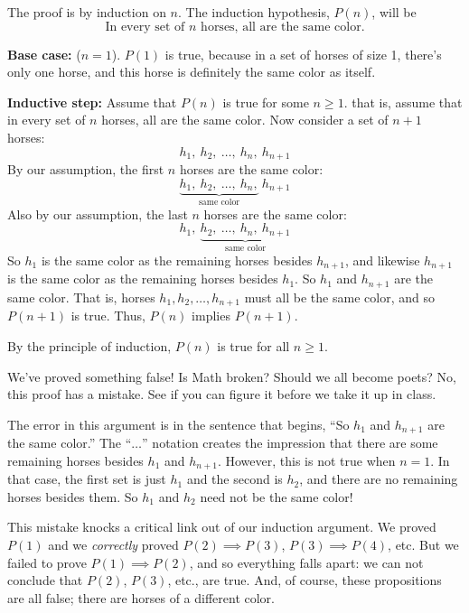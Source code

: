 \begin{falseproof}

The proof is by induction on $n$.  The induction hypothesis, $P(n)$, will be
\begin{equation}\label{horsehyp}
\text{In every set of $n$ horses, all are the same color.}
\end{equation}

\textbf{Base case:} ($n=1$).  $P(1)$ is true, because in a set of horses
of size 1, there's only one horse, and this horse is definitely the same
color as itself.

\textbf{Inductive step:} Assume that $P(n)$ is true for some $n \geq 1$.
that is, assume that in every set of $n$ horses, all are the same color.
Now consider a set of $n+1$ horses:
%
\[
h_1,\ h_2,\ \dots,\ h_n,\ h_{n+1}
\]
%
By our assumption, the first $n$ horses are the same color:
%
\[
\underbrace{h_1,\ h_2,\ \dots,\ h_n,}_{\text{same color}}\ h_{n+1}
\]
%
Also by our assumption, the last $n$ horses are the same color:
%
\[
h_1,\ \underbrace{h_2,\ \dots,\ h_n,\ h_{n+1}}_{\text{same color}}
\]
%
So $h_1$ is the same color as the remaining horses besides $h_{n+1}$, and
likewise $h_{n+1}$ is the same color as the remaining horses besides
$h_1$.  So $h_1$ and $h_{n+1}$ are the same color.  That is, horses $h_1,
h_2, \dots, h_{n+1}$ must all be the same color, and so $P(n+1)$ is true.
Thus, $P(n)$ implies $P(n+1)$.

By the principle of induction, $P(n)$ is true for all $n \geq 1$.
\end{falseproof}
We've proved something false!  Is Math broken?  Should we all become
poets?  No, this proof has a mistake.
See if you can figure it before we take it up in class.

\iffalse %

The error in this argument is in the sentence that begins, ``So $h_1$ and
$h_{n+1}$ are the same color.''  The ``$\dots$'' notation creates the
impression that there are some remaining horses besides $h_1$ and
$h_{n+1}$.  However, this is not true when $n = 1$.  In that case, the
first set is just $h_1$ and the second is $h_2$, and there are no
remaining horses besides them.  So $h_1$ and $h_2$ need not be the same
color!

This mistake knocks a critical link out of our induction argument.  We
proved $P(1)$ and we \emph{correctly} proved $P(2) \implies P(3)$, $P(3)
\implies P(4)$, etc.  But we failed to prove $P(1) \implies P(2)$, and so
everything falls apart: we can not conclude that $P(2)$, $P(3)$, etc., are
true.  And, of course, these propositions are all false; there are horses
of a different color.

